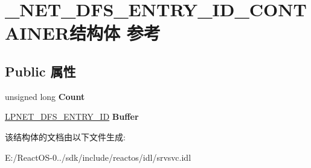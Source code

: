\hypertarget{struct___n_e_t___d_f_s___e_n_t_r_y___i_d___c_o_n_t_a_i_n_e_r}{}\section{\+\_\+\+N\+E\+T\+\_\+\+D\+F\+S\+\_\+\+E\+N\+T\+R\+Y\+\_\+\+I\+D\+\_\+\+C\+O\+N\+T\+A\+I\+N\+E\+R结构体 参考}
\label{struct___n_e_t___d_f_s___e_n_t_r_y___i_d___c_o_n_t_a_i_n_e_r}
\subsection*{Public 属性}
\begin{DoxyCompactItemize}
\item 
\mbox{\label{struct___n_e_t___d_f_s___e_n_t_r_y___i_d___c_o_n_t_a_i_n_e_r_a8abacc97fb1ae24635f8d033d2a02f14}} 
unsigned long {\bfseries Count}
\item 
\mbox{\label{struct___n_e_t___d_f_s___e_n_t_r_y___i_d___c_o_n_t_a_i_n_e_r_a935ae994ff65e1212055b00ba018b613}} 
\hyperlink{struct___n_e_t___d_f_s___e_n_t_r_y___i_d}{L\+P\+N\+E\+T\+\_\+\+D\+F\+S\+\_\+\+E\+N\+T\+R\+Y\+\_\+\+ID} {\bfseries Buffer}
\end{DoxyCompactItemize}


该结构体的文档由以下文件生成\+:\begin{DoxyCompactItemize}
\item 
E\+:/\+React\+O\+S-\/0../sdk/include/reactos/idl/srvsvc.\+idl\end{DoxyCompactItemize}

